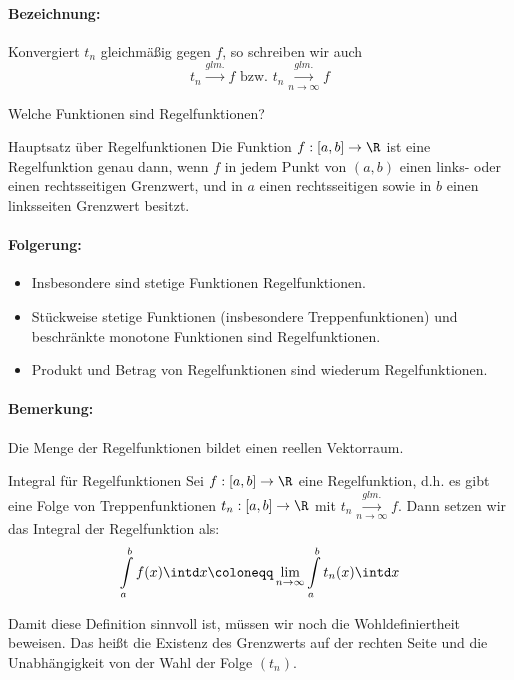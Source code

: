 \paragraph{Bezeichnung:}
Konvergiert $t_n$ gleichmäßig gegen $f$, so schreiben wir auch
\begin{equation*}
	t_n\overset{glm.}\longrightarrow f \text{ bzw. } t_n\overset{glm.}{\underset{n\to\infty}\longrightarrow} f
\end{equation*}


Welche Funktionen sind Regelfunktionen?
\begin{satz}{Hauptsatz über Regelfunktionen}
	Die Funktion $f:[a,b]\rightarrow\R$ ist eine Regelfunktion genau dann, wenn $f$ in jedem Punkt von $(a,b)$ einen links- oder einen rechtsseitigen Grenzwert, und in $a$ einen rechtsseitigen sowie in $b$ einen linksseiten Grenzwert besitzt.
\end{satz}
\paragraph{Folgerung:}
\begin{itemize}
	\item Insbesondere sind stetige Funktionen Regelfunktionen.
	\item Stückweise stetige Funktionen (insbesondere Treppenfunktionen) und beschränkte monotone Funktionen sind Regelfunktionen.
	\item Produkt und Betrag von Regelfunktionen sind wiederum Regelfunktionen.
\end{itemize}
\paragraph{Bemerkung:}
Die Menge der Regelfunktionen bildet einen reellen Vektorraum.

\begin{definition}{Integral für Regelfunktionen}
	Sei $f:[a,b]\rightarrow\R$ eine Regelfunktion, d.h. es gibt eine Folge von Treppenfunktionen $t_n:[a,b]\rightarrow\R$ mit $t_n\overset{glm.}{\underset{n\to\infty}\longrightarrow} f$.
	Dann setzen wir das Integral der Regelfunktion als:
	\begin{equation*}
		\int\limits_a^b f(x)\intd x\coloneqq \lim\limits_{n\to\infty}\int\limits_a^b t_n(x)\intd x
	\end{equation*}
\end{definition}

Damit diese Definition sinnvoll ist, müssen wir noch die Wohldefiniertheit beweisen. Das heißt die Existenz des Grenzwerts auf der rechten Seite und die Unabhängigkeit von der Wahl der Folge $(t_n)$.

